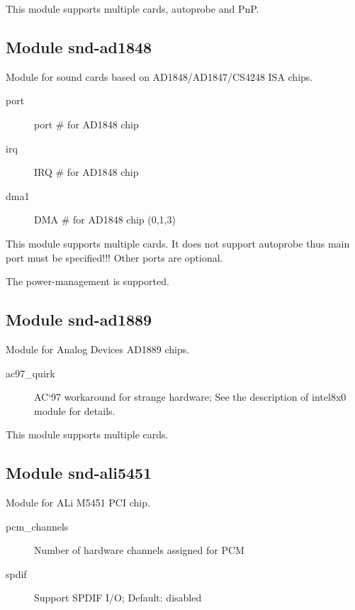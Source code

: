 \documentclass[a4paper,8pt,english]{sphinxmanual}
\begin{document}
This module supports multiple cards, autoprobe and PnP.


\subsection{Module snd-ad1848}
\label{sound/alsa-configuration:module-snd-ad1848}
Module for sound cards based on AD1848/AD1847/CS4248 ISA chips.
\begin{description}
\item[{port}] \leavevmode
port \# for AD1848 chip

\item[{irq}] \leavevmode
IRQ \# for AD1848  chip

\item[{dma1}] \leavevmode
DMA \# for AD1848 chip (0,1,3)

\end{description}

This module supports multiple cards.  It does not support autoprobe
thus main port must be specified!!! Other ports are optional.

The power-management is supported.


\subsection{Module snd-ad1889}
\label{sound/alsa-configuration:module-snd-ad1889}
Module for Analog Devices AD1889 chips.
\begin{description}
\item[{ac97\_quirk}] \leavevmode
AC`97 workaround for strange hardware;
See the description of intel8x0 module for details.

\end{description}

This module supports multiple cards.


\subsection{Module snd-ali5451}
\label{sound/alsa-configuration:module-snd-ali5451}
Module for ALi M5451 PCI chip.
\begin{description}
\item[{pcm\_channels}] \leavevmode
Number of hardware channels assigned for PCM

\item[{spdif}] \leavevmode
Support SPDIF I/O;
Default: disabled

\end{description}
\end{document}
